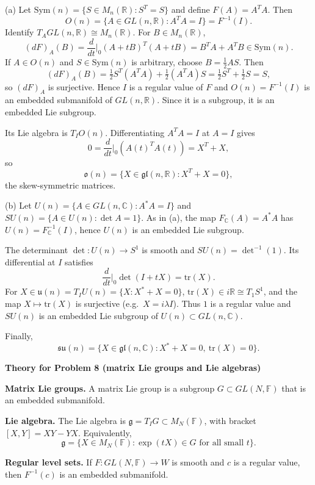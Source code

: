 \begin{solution}
(a) Let $\mathrm{Sym}(n)=\{S\in M_n(\mathbb R):S^T=S\}$ and define $F(A)=A^TA$.
Then
\[
O(n)=\{A\in GL(n,\mathbb R):A^TA=I\}=F^{-1}(I).
\]
Identify $T_AGL(n,\mathbb R)\cong M_n(\mathbb R)$. For $B\in M_n(\mathbb R)$,
\[
(dF)_A(B)=\frac{d}{dt}\Big|_{0}(A+tB)^T(A+tB)=B^TA+A^TB\in\mathrm{Sym}(n).
\]
If $A\in O(n)$ and $S\in\mathrm{Sym}(n)$ is arbitrary, choose $B=\tfrac12 AS$. Then
\[
(dF)_A(B)=\tfrac12 S^T(A^TA)+\tfrac12(A^TA)S=\tfrac12 S^T+\tfrac12 S=S,
\]
so $(dF)_A$ is surjective. Hence $I$ is a regular value of $F$ and $O(n)=F^{-1}(I)$
is an embedded submanifold of $GL(n,\mathbb R)$. Since it is a subgroup, it is an embedded Lie subgroup.

Its Lie algebra is $T_IO(n)$. Differentiating $A^TA=I$ at $A=I$ gives
\[
0=\frac{d}{dt}\Big|_{0}(A(t)^TA(t))=X^T+X,
\]
so
\[
\mathfrak o(n)=\{X\in\mathfrak{gl}(n,\mathbb R):X^T+X=0\},
\]
the skew-symmetric matrices.

(b) Let $U(n)=\{A\in GL(n,\mathbb C):A^*A=I\}$ and $SU(n)=\{A\in U(n):\det A=1\}$.
As in (a), the map $F_{\mathbb C}(A)=A^*A$ has $U(n)=F_{\mathbb C}^{-1}(I)$, hence $U(n)$ is an embedded Lie subgroup.

The determinant $\det:U(n)\to S^1$ is smooth and $SU(n)=\det^{-1}(1)$.
Its differential at $I$ satisfies
\[
\frac{d}{dt}\Big|_{0}\det(I+tX)=\mathrm{tr}(X).
\]
For $X\in\mathfrak u(n)=T_IU(n)=\{X:X^*+X=0\}$, $\mathrm{tr}(X)\in i\mathbb R\cong T_1S^1$,
and the map $X\mapsto \mathrm{tr}(X)$ is surjective (e.g.\ $X=i\lambda I$).
Thus $1$ is a regular value and $SU(n)$ is an embedded Lie subgroup of $U(n)\subset GL(n,\mathbb C)$.

Finally,
\[
\mathfrak{su}(n)=\{X\in\mathfrak{gl}(n,\mathbb C):X^*+X=0,\ \mathrm{tr}(X)=0\}.
\]

\par\medskip\noindent\textbf{Theory for Problem 8 (matrix Lie groups and Lie algebras)}\par\smallskip


\textbf{Matrix Lie groups.}
A matrix Lie group is a subgroup $G\subset GL(N,\mathbb F)$ that is an embedded submanifold.

\textbf{Lie algebra.}
The Lie algebra is $\mathfrak g=T_I G\subset M_N(\mathbb F)$, with bracket $[X,Y]=XY-YX$.
Equivalently,
\[
\mathfrak g = \{X\in M_N(\mathbb F): \exp(tX)\in G \text{ for all small } t\}.
\]

\textbf{Regular level sets.}
If $F:GL(N,\mathbb F)\to W$ is smooth and $c$ is a regular value, then $F^{-1}(c)$ is an embedded submanifold.


\end{solution}

